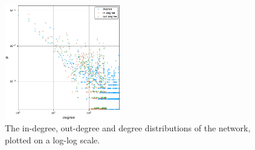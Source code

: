 \begin{figure}
  \includegraphics[width=0.45\textwidth]{../plots/degreesmall2}
  \caption{The in-degree, out-degree and degree distributions of the network,
    plotted on a log-log scale.}
  \label{fig:dist}
\end{figure}

